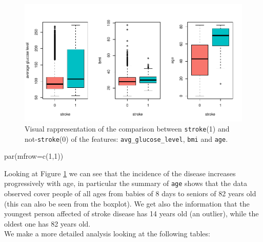 \documentclass[
]{article}
\newenvironment{Shaded}{\begin{snugshade}}{\end{snugshade}}
\newcommand{\AttributeTok}[1]{\textcolor[rgb]{0.77,0.63,0.00}{#1}}
\newcommand{\DecValTok}[1]{\textcolor[rgb]{0.00,0.00,0.81}{#1}}
\newcommand{\FloatTok}[1]{\textcolor[rgb]{0.00,0.00,0.81}{#1}}
\newcommand{\FunctionTok}[1]{\textcolor[rgb]{0.00,0.00,0.00}{#1}}
\newcommand{\NormalTok}[1]{#1}
\newcommand{\OtherTok}[1]{\textcolor[rgb]{0.56,0.35,0.01}{#1}}
\newcommand{\SpecialCharTok}[1]{\textcolor[rgb]{0.00,0.00,0.00}{#1}}
\newcommand{\StringTok}[1]{\textcolor[rgb]{0.31,0.60,0.02}{#1}}
\begin{document}
\begin{figure}
\centering
\includegraphics{stat-project-stroke_files/figure-latex/bp_stroke-1.pdf}
\caption{\label{bp_stroke}Visual rappresentation of the comparison
between \texttt{stroke}(1) and not-\texttt{stroke}(0) of the features:
\texttt{avg\_glucose\_level}, \texttt{bmi} and \texttt{age}.}
\end{figure}

\begin{Shaded}
\begin{Highlighting}[]
\FunctionTok{par}\NormalTok{(}\AttributeTok{mfrow=}\FunctionTok{c}\NormalTok{(}\DecValTok{1}\NormalTok{,}\DecValTok{1}\NormalTok{))}
\end{Highlighting}
\end{Shaded}

Looking at Figure \ref{bp_stroke} we can see that the incidence of the
disease increases progressively with age, in particular the summary of
\texttt{age} shows that the data observed cover people of all ages from
babies of 8 days to seniors of 82 years old (this can also be seen from the boxplot). We get also the information that the youngest person
affected of stroke disease has 14 years old (an outlier), while the
oldest one has 82 years old.\\
We make a more detailed analysis looking at the following tables:

\begin{Shaded}
\end{Shaded}
\end{document}
